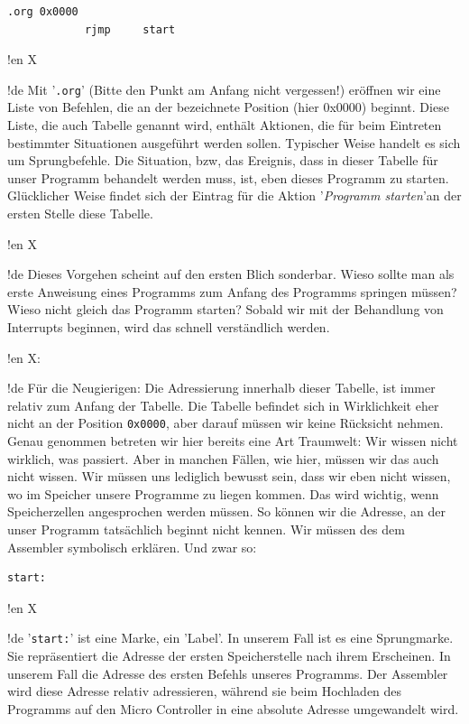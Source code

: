 \begin{lstlisting}
.org 0x0000
            rjmp     start 
\end{lstlisting}



!en X

!de Mit '\texttt{.org}' (Bitte den Punkt am Anfang nicht vergessen!) eröffnen wir eine Liste von Befehlen, die an der bezeichnete Position (hier 0x0000) beginnt. Diese Liste, die auch Tabelle genannt wird, enthält Aktionen, die für beim Eintreten bestimmter Situationen ausgeführt werden sollen. Typischer Weise handelt es sich um Sprungbefehle. Die Situation, bzw, das Ereignis, dass in dieser Tabelle für unser Programm behandelt werden muss, ist, eben dieses Programm zu starten. Glücklicher Weise findet sich der Eintrag für die Aktion '\textit{Programm starten}'an der ersten Stelle diese Tabelle.


 
!en X

!de Dieses Vorgehen scheint auf den ersten Blich sonderbar. Wieso sollte man als erste Anweisung eines Programms zum Anfang des Programms springen müssen? Wieso nicht gleich das Programm starten? Sobald wir mit der Behandlung von Interrupts beginnen, wird das schnell verständlich werden.



!en X:

!de Für die Neugierigen: Die Adressierung innerhalb dieser Tabelle, ist immer relativ zum Anfang der Tabelle. Die Tabelle befindet sich in Wirklichkeit eher nicht an der Position \texttt{0x0000}, aber darauf müssen wir keine Rücksicht nehmen. Genau genommen betreten wir hier bereits eine Art Traumwelt: Wir wissen nicht wirklich, was passiert. Aber in manchen Fällen, wie hier, müssen wir das auch nicht wissen. Wir müssen uns lediglich bewusst sein, dass wir eben nicht wissen, wo im Speicher unsere Programme zu liegen kommen. Das wird wichtig, wenn Speicherzellen angesprochen werden müssen. So können wir die Adresse, an der unser Programm tatsächlich beginnt nicht kennen. Wir müssen des dem Assembler symbolisch erklären. Und zwar so:

\begin{lstlisting}
start:
\end{lstlisting}



!en X

!de '\texttt{start:}' ist eine Marke, ein 'Label'. In unserem Fall ist es eine Sprungmarke. Sie repräsentiert die Adresse der ersten Speicherstelle nach ihrem Erscheinen. In unserem Fall die Adresse des ersten Befehls unseres Programms. Der Assembler wird diese Adresse relativ adressieren, während sie beim Hochladen des Programms auf den Micro Controller in eine absolute Adresse umgewandelt wird.



